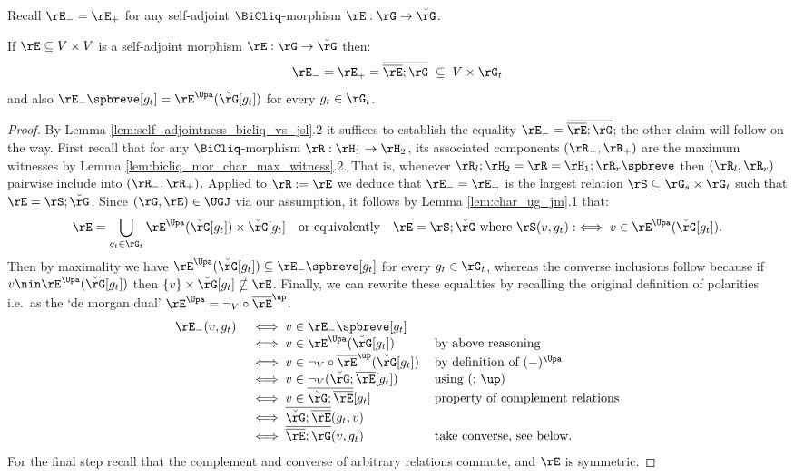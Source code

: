 \documentclass{article}
\begin{document}
Recall $\rE_- = \rE_+$ for any self-adjoint $\BiCliq$-morphism $\rE : \rG \to \breve{\rG}$.


\begin{lemma}
\label{lem:self_adjoint_component_description}
If $\rE \subseteq V \times V$ is a self-adjoint morphism $\rE : \rG \to \breve{\rG}$ then:
\[
\rE_- = \rE_+ = \overline{\overline{\rE} ; \rG} \; \subseteq \; V \times \rG_t
\]
and also $\rE_-\spbreve[g_t] = \rE^\Upa(\breve{\rG}[g_t])$ for every $g_t \in \rG_t$.
\end{lemma}

\begin{proof}
By Lemma \ref{lem:self_adjointness_bicliq_vs_jsl}.2 it suffices to establish the equality $\rE_- = \overline{\overline{\rE} ; \rG}$; the other claim will follow on the way. First recall that for any $\BiCliq$-morphism $\rR : \rH_1 \to \rH_2$, its associated components $(\rR_-,\rR_+)$ are the maximum witnesses by Lemma \ref{lem:bicliq_mor_char_max_witness}.2. That is, whenever $\rR_l ; \rH_2 = \rR = \rH_1 ; \rR_r\spbreve$ then $(\rR_l,\rR_r)$ pairwise include into $(\rR_-,\rR_+)$. Applied to $\rR := \rE$ we deduce that $\rE_- = \rE_+$ is the largest relation $\rS \subseteq \rG_s \times \rG_t$ such that $\rE = \rS ; \breve{\rG}$. Since $(\rG,\rE) \in \UGJ$ via our assumption, it follows by Lemma \ref{lem:char_ug_jm}.1 that:
\[
\rE = \bigcup_{g_t \in \rG_t} \rE^\Upa(\breve{\rG}[g_t]) \times \breve{\rG}[g_t]
\quad\text{or equivalently}\quad
\text{$\rE = \rS ; \breve{\rG}$ where $\rS(v,g_t) :\iff v \in \rE^\Upa(\breve{\rG}[g_t])$}.
\]
Then by maximality we have $\rE^\Upa(\breve{\rG}[g_t]) \subseteq \rE_-\spbreve[g_t]$ for every $g_t \in \rG_t$, whereas the converse inclusions follow because if $v \nin \rE^\Upa(\breve{\rG}[g_t])$ then $\{v\} \times \breve{\rG}[g_t] \nsubseteq \rE$. Finally, we can rewrite these equalities by recalling the original definition of polarities i.e.\ as the `de morgan dual' $\rE^\Upa = \neg_V \circ \overline{\rE}^\up$.
\[
\begin{tabular}{lll}
$\rE_-(v,g_t)$
&
$\iff v \in \rE_-\spbreve[g_t]$
\\&
$\iff v \in \rE^\Upa(\breve{\rG}[g_t])$
& by above reasoning
\\&
$\iff v \in \neg_V \circ \overline{\rE}^\up(\breve{\rG}[g_t])$
& by definition of $(-)^\Upa$
\\&
$\iff v \in \neg_V (\breve{\rG} ; \overline{\rE}[g_t])$
& using $(; \, \up)$
\\&
$\iff v \in \overline{\breve{\rG} ; \overline{\rE}}[g_t]$
& property of complement relations
\\&
$\iff \overline{\breve{\rG} ; \overline{\rE}}(g_t,v)$
\\&
$\iff \overline{\overline{\rE} ; \rG}(v,g_t)$
& take converse, see below.
\end{tabular}
\]
For the final step recall that the complement and converse of arbitrary relations commute, and $\rE$ is symmetric.
\end{proof}
\end{document}
